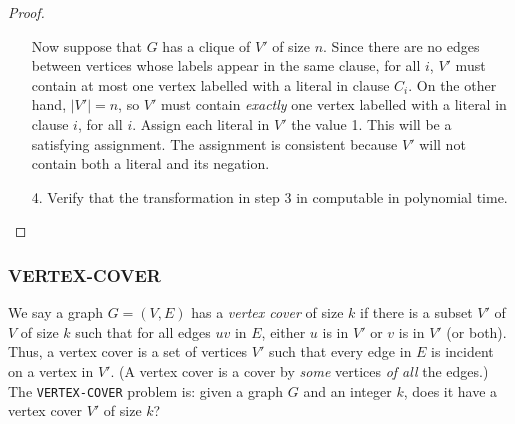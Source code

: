 \documentclass[12pt]{article}
\theoremstyle{plain}
\theoremstyle{definition}
\newcommand{\lecture}[1]{\marginpar{{\footnotesize $\leftarrow$ \underline{#1}}}}
\begin{document}
\begin{proof}
\begin{enumerate}
  Now suppose that $G$ has a clique of $V'$ of size $n$.
  Since there are no edges between vertices whose labels appear in the same clause, for all $i$, $V'$ must contain at most one vertex labelled with a literal in clause $C_{i}$.
  On the other hand, $|V'| = n$, so $V'$ must contain \emph{exactly} one vertex labelled with a literal in clause $i$, for all $i$.
  Assign each literal in $V'$ the value 1.
  This will be a satisfying assignment.
  The assignment is consistent because $V'$ will not contain both a literal and its negation.

  \item[4.] Verify that the transformation in step 3 in computable in polynomial time.
\end{enumerate}
\end{proof}

\subsubsection{VERTEX-COVER}
\lecture{2016/11/29}
We say a graph $G = (V, E)$ has a \emph{vertex cover} of size $k$ if there is a subset $V'$ of $V$ of size $k$ such that for all edges $uv$ in $E$, either $u$ is in $V'$ or $v$ is in $V'$ (or both).
Thus, a vertex cover is a set of vertices $V'$ such that every edge in $E$ is incident on a vertex in $V'$. (A vertex cover is a cover by \emph{some} vertices \emph{of all} the edges.) \\

The \texttt{VERTEX-COVER} problem is: given a graph $G$ and an integer $k$, does it have a vertex cover $V'$ of size $k$?
\end{document}

